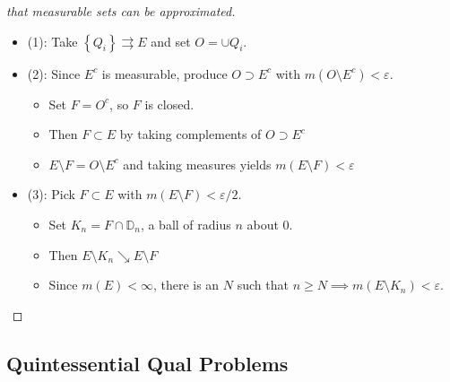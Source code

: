 \begin{proof}[that measurable sets can be approximated]

\envlist

\begin{itemize}
\tightlist
\item
  (1): Take \(\left\{{Q_{i}}\right\} \rightrightarrows E\) and set
  \(O = \cup Q_{i}\).
\item
  (2): Since \(E^c\) is measurable, produce \(O\supset E^c\) with
  \(m(O\setminus E^c) < {\varepsilon}\).

  \begin{itemize}
  \tightlist
  \item
    Set \(F = O^c\), so \(F\) is closed.
  \item
    Then \(F\subset E\) by taking complements of \(O\supset E^c\)
  \item
    \(E\setminus F = O\setminus E^c\) and taking measures yields
    \(m(E\setminus F) < {\varepsilon}\)
  \end{itemize}
\item
  (3): Pick \(F\subset E\) with \(m(E\setminus F) < {\varepsilon}/2\).

  \begin{itemize}
  \tightlist
  \item
    Set \(K_{n} = F\cap{\mathbb{D}}_{n}\), a ball of radius \(n\) about
    \(0\).
  \item
    Then \(E\setminus K_{n} \searrow E\setminus F\)
  \item
    Since \(m(E) < \infty\), there is an \(N\) such that
    \(n\geq N \implies m(E\setminus K_{n}) < {\varepsilon}\).
  \end{itemize}
\end{itemize}

\end{proof}

\hypertarget{quintessential-qual-problems}{%
\subsection{Quintessential Qual
Problems}\label{quintessential-qual-problems}}

